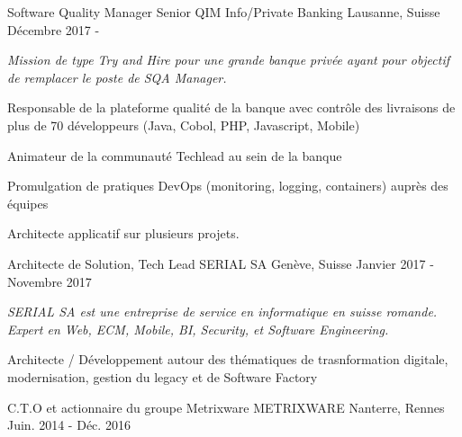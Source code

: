

\begin{cventries}
\cventry
{Software Quality Manager Senior} %
{QIM Info/Private Banking} %
{Lausanne, Suisse} %
{Décembre 2017 - } %
{
    \begin{cvitems} %
        \item {\textit{Mission de type Try and Hire pour une grande banque privée ayant pour objectif de remplacer le poste de SQA Manager.}}
        \item {Responsable de la plateforme qualité de la banque avec contrôle des livraisons de plus de 70 développeurs (Java, Cobol, PHP, Javascript, Mobile)}
        \item {Animateur de la communauté Techlead au sein de la banque}        
        \item {Promulgation de pratiques DevOps (monitoring, logging, containers) auprès des équipes}        
        \item {Architecte applicatif sur plusieurs projets.}                
    \end{cvitems}
}%
\cventry
{Architecte de Solution, Tech Lead} %
{SERIAL SA} %
{Genève, Suisse} %
{Janvier 2017 - Novembre 2017 } %
{
	\begin{cvitems} %
		\item {\textit{SERIAL SA est une entreprise de service en informatique en suisse romande. Expert en Web, ECM, Mobile, BI, Security, et Software Engineering.}}
		\item {Architecte / Développement autour des thématiques de trasnformation digitale, modernisation, gestion du legacy et de Software Factory}
	\end{cvitems}
}
  \cventry
    {C.T.O et actionnaire du groupe Metrixware} %
    {METRIXWARE} %
    {Nanterre, Rennes} %
    {Juin. 2014 - Déc. 2016} %

\end{cventries}
